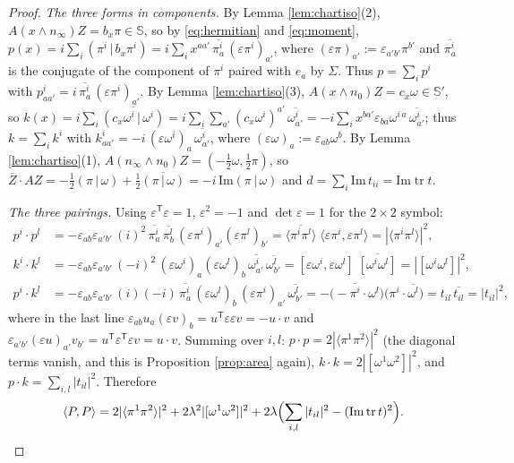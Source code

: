 \documentclass[11pt]{article}
\theoremstyle{definition}
\newcommand{\tr}{\operatorname{tr}}
\newcommand{\ip}[2]{\langle #1, #2\rangle}
\newcommand{\br}[1]{\langle #1\rangle}
\newcommand{\hp}[2]{( #1 \,|\, #2 )}
\newcommand{\Sc}{\mathbb{S}}
\begin{document}
\begin{proof}
\emph{The three forms in components.} By Lemma \ref{lem:chartiso}(2), $A(x\wedge n_{\infty})Z = b_{x}\pi \in \Sc$, so by \eqref{eq:hermitian} and \eqref{eq:moment}, $p(x) = i\sum_{i}\hp{\pi^{i}}{b_{x}\pi^{i}} = i\sum_{i} x^{aa'}\,\overline{\pi^{i}_{a}}\,(\varepsilon\pi^{i})_{a'}$, where $(\varepsilon\pi)_{a'} := \varepsilon_{a'b'}\pi^{b'}$ and $\overline{\pi^{i}_{a}}$ is the conjugate of the component of $\pi^{i}$ paired with $e_{a}$ by $\Sigma$. Thus $p = \sum_{i}p^{i}$ with $p^{i}_{aa'} = i\,\overline{\pi^{i}_{a}}\,(\varepsilon\pi^{i})_{a'}$. By Lemma \ref{lem:chartiso}(3), $A(x\wedge n_{0})Z = c_{x}\omega \in \Sc'$, so $k(x) = i\sum_{i}\overline{\hp{c_{x}\omega^{i}}{\omega^{i}}} = i\sum_{i}\sum_{a'}(c_{x}\omega^{i})^{a'}\,\overline{\omega^{i}_{a'}} = -i\sum_{i}x^{ba'}\varepsilon_{ba}\omega^{i\,a}\,\overline{\omega^{i}_{a'}}$; thus $k = \sum_{i}k^{i}$ with $k^{i}_{aa'} = -i\,(\varepsilon\omega^{i})_{a}\,\overline{\omega^{i}_{a'}}$, where $(\varepsilon\omega)_{a} := \varepsilon_{ab}\omega^{b}$. By Lemma \ref{lem:chartiso}(1), $A(n_{\infty}\wedge n_{0})Z = (-\tfrac12\omega, \tfrac12\pi)$, so $\bar{Z}\cdot AZ = -\tfrac12\hp{\pi}{\omega} + \tfrac12\overline{\hp{\pi}{\omega}} = -i\,\mathrm{Im}\hp{\pi}{\omega}$ and $d = \sum_{i}\mathrm{Im}\,t_{ii} = \mathrm{Im}\tr t$.

\emph{The three pairings.} Using $\varepsilon^{\mathsf T}\varepsilon = 1$, $\varepsilon^{2} = -1$ and $\det\varepsilon = 1$ for the $2\times 2$ symbol:
\begin{align*}
p^{i}\cdot p^{l} &= -\varepsilon_{ab}\varepsilon_{a'b'}\,(i)^{2}\,\overline{\pi^{i}_{a}}\,\overline{\pi^{l}_{b}}\,(\varepsilon\pi^{i})_{a'}(\varepsilon\pi^{l})_{b'}
= \overline{\br{\pi^{i}\pi^{l}}}\;\br{\varepsilon\pi^{i},\varepsilon\pi^{l}} = |\br{\pi^{i}\pi^{l}}|^{2},\\
k^{i}\cdot k^{l} &= -\varepsilon_{ab}\varepsilon_{a'b'}\,(-i)^{2}\,(\varepsilon\omega^{i})_{a}(\varepsilon\omega^{l})_{b}\,\overline{\omega^{i}_{a'}}\,\overline{\omega^{l}_{b'}}
= [\varepsilon\omega^{i},\varepsilon\omega^{l}]\;\overline{[\omega^{i}\omega^{l}]} = |[\omega^{i}\omega^{l}]|^{2},\\
p^{i}\cdot k^{l} &= -\varepsilon_{ab}\varepsilon_{a'b'}\,(i)(-i)\,\overline{\pi^{i}_{a}}\,(\varepsilon\omega^{l})_{b}\,(\varepsilon\pi^{i})_{a'}\,\overline{\omega^{l}_{b'}}
= -\bigl(-\overline{\pi^{i}}\cdot\omega^{l}\bigr)\bigl(\pi^{i}\cdot\overline{\omega^{l}}\bigr) = t_{il}\,\overline{t_{il}} = |t_{il}|^{2},
\end{align*}
where in the last line $\varepsilon_{ab}u_{a}(\varepsilon v)_{b} = u^{\mathsf T}\varepsilon\varepsilon v = -u\cdot v$ and $\varepsilon_{a'b'}(\varepsilon u)_{a'}v_{b'} = u^{\mathsf T}\varepsilon^{\mathsf T}\varepsilon v = u\cdot v$. Summing over $i, l$: $p\cdot p = 2|\br{\pi^{1}\pi^{2}}|^{2}$ (the diagonal terms vanish, and this is Proposition \ref{prop:area} again), $k\cdot k = 2|[\omega^{1}\omega^{2}]|^{2}$, and $p\cdot k = \sum_{i,l}|t_{il}|^{2}$. Therefore
\[
\ip{P}{P} = 2|\br{\pi^{1}\pi^{2}}|^{2} + 2\lambda^{2}|[\omega^{1}\omega^{2}]|^{2} + 2\lambda\Bigl(\sum_{i,l}|t_{il}|^{2} - (\mathrm{Im}\tr t)^{2}\Bigr).
\]


\end{proof}
\end{document}
